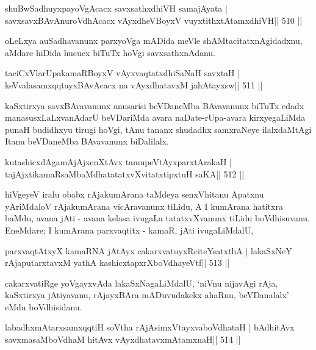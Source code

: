 \begin{shl}
shuBwSadhuyxpayoVgAcacx savxsathxdhiVH samajAyata |
savxsavxBAvAnuroVdhAcacx vAyxdheVBoyxV vuyxtithxtAtamxdhiVH\hfill || 510 ||
\end{shl}

\begin{artha}
oLeLxya auSadhavanunx parxyoVga mADida meVle shAMtacitatxnAgidadxnu, aMdare hiDida hucucx biTuTx hoVgi savxsathxnAdanu.
\end{artha}

\begin{shl}
taciCxVlarUpakamaRBoyxV vAyxvaqtatxdhiSaNaH savxtaH |
keVvalasamxqqtayxBAvAcacx na vAyxdhatavxM ja{hA}tayxsw\hfill || 511 ||
\end{shl}

\begin{artha}
kaSxtirxya savxBAvavanunx anusarisi beVDaneMba BAvavanunx biTuTx edadx manasusxLaLxvanAdarU beVDariMda avara naDate-rUpa-avara kirxyegaLiMda punaH budidhxyu tirugi hoVgi, tAnu tananx shudadhx samxraNeye ilalxdaMtAgi Itanu beVDaneMba BAvavanunx biDalilalx.
\end{artha}

\begin{shl}
kutashicxdAgamAjAjxcnXtAvx tamupeVtAyxparxtArakaH |
tajAjxtikamaRsaMbaMdhatatatxvXvitatxtipxtuH saKA\hfill || 512 ||
\end{shl}

\begin{artha}
hiVgeyeV iralu obabx rAjakumArana taMdeya
senxVhitanu Apatxnu yAriMdaloV rAjakumArana vicAravanunx tiLidu, A I
kumArana hatitxra baMdu, avana jAti - avana kelasa ivugaLa
tatatxvXvanunx tiLidu boVdhisuvanu. EneMdare; I kumArana parxvaqtitx -
kamaR, jAti ivugaLiMdalU,  
\end{artha}

\begin{shl}
parxvaqtAtxyX kamaRNA jAtAyx cakarxvatuyxRciteYsatxthA |
lakaSxNeY rAjaputarxtavxM yathA kashicxtapxrXboVdhayeVtf\hfill || 513 ||
\end{shl}

\begin{artha}
cakarxvatiRge yoVgayxvAda lakaSxNagaLiMdalU, `niVnu nijavAgi rAja, kaSxtirxya jAtiyavanu, rAjayxBAra mADuvudakekx ahaRnu, beVDanalalx' eMdu boVdhisidanu.
\end{artha}

\begin{shl}
labadhxmAtarxsamxqqtiH soV\s tha rAjA\s simxVtayxvaboVdhataH |
bAdhitAvx savxmasaMboVdhaM hitAvx vAyxdhatavxmAtamxnaH\hfill || 514 ||
\end{shl}

